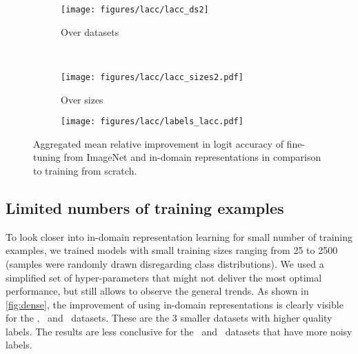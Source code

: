 \begin{figure}[tb]


     \centering
     \begin{subfigure}[b]{0.3\textwidth}
        \centering
\texttt{[image: figures/lacc/lacc\_ds2]}
         \caption{Over datasets}
         \label{fig:lacc_datasets}
     \end{subfigure}~\qquad
     \begin{subfigure}[b]{0.3\textwidth}
        \centering
\texttt{[image: figures/lacc/lacc\_sizes2.pdf]}
         \vspace*{0.5em}
         \caption{Over sizes}
         \label{fig:lacc_sizes}
     \end{subfigure}
     \qquad
     \begin{subfigure}[b]{0.2\textwidth}
        \centering
\texttt{[image: figures/lacc/labels\_lacc.pdf]}
         \vspace*{6em}
     \end{subfigure}
    \caption{Aggregated mean relative improvement in logit accuracy of fine-tuning from ImageNet and in-domain representations in comparison to training from scratch.
}
    \label{fig:relative-improvement}
\end{figure}





\subsection{Limited numbers of training examples}
To look closer into in-domain representation learning for small number of training examples, we trained models with small training sizes ranging from 25 to 2500 (samples were randomly drawn disregarding class distributions). We used a simplified set of hyper-parameters that might not deliver the most optimal performance, but still allows to observe the general trends.
As shown in \cref{fig:dense}, the improvement of using in-domain representations is clearly visible for the \eur, \res\ and \ucm\ datasets. These are the 3 smaller datasets with higher quality labels. The results are less conclusive for the \ben\ and \sos\ datasets that have more noisy labels.





